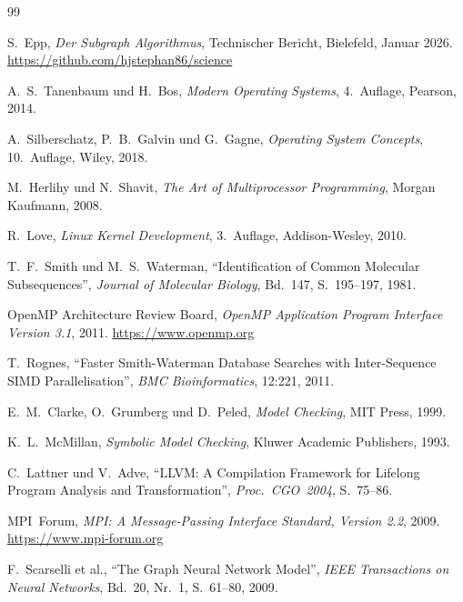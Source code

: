 ﻿\documentclass[a4paper,12pt]{article}
\theoremstyle{definition}
\begin{document}
\begin{thebibliography}{99}

  S.~Epp,
  \textit{Der Subgraph Algorithmus},
  Technischer Bericht, Bielefeld, Januar 2026.
  \url{https://github.com/hjstephan86/science}

  A.~S.~Tanenbaum und H.~Bos,
  \textit{Modern Operating Systems}, 4.~Auflage,
  Pearson, 2014.

  A.~Silberschatz, P.~B.~Galvin und G.~Gagne,
  \textit{Operating System Concepts}, 10.~Auflage,
  Wiley, 2018.

  M.~Herlihy und N.~Shavit,
  \textit{The Art of Multiprocessor Programming},
  Morgan Kaufmann, 2008.

  R.~Love,
  \textit{Linux Kernel Development}, 3.~Auflage,
  Addison-Wesley, 2010.

  T.~F.~Smith und M.~S.~Waterman,
  ``Identification of Common Molecular Subsequences'',
  \textit{Journal of Molecular Biology},
  Bd.~147, S.~195--197, 1981.

  OpenMP Architecture Review Board,
  \textit{OpenMP Application Program Interface Version 3.1},
  2011.
  \url{https://www.openmp.org}

  T.~Rognes,
  \enquote{Faster Smith-Waterman Database Searches with Inter-Sequence
  SIMD Parallelisation},
  \textit{BMC Bioinformatics}, 12:221, 2011.

  E.~M.~Clarke, O.~Grumberg und D.~Peled,
  \textit{Model Checking},
  MIT Press, 1999.

  K.~L.~McMillan,
  \textit{Symbolic Model Checking},
  Kluwer Academic Publishers, 1993.

  C.~Lattner und V.~Adve,
  \enquote{LLVM: A Compilation Framework for Lifelong Program Analysis
  and Transformation},
  \textit{Proc.\ CGO~2004}, S.~75--86.

  MPI~Forum,
  \textit{MPI: A Message-Passing Interface Standard, Version 2.2},
  2009.
  \url{https://www.mpi-forum.org}

  F.~Scarselli et al.,
  ``The Graph Neural Network Model'',
  \textit{IEEE Transactions on Neural Networks},
  Bd.~20, Nr.~1, S.~61--80, 2009.


\end{thebibliography}
\end{document}

